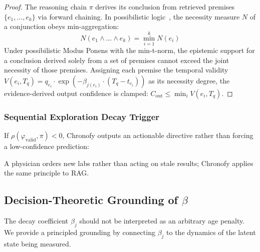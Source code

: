 \documentclass[conference]{IEEEtran}
\begin{document}
\begin{proof}
The reasoning chain $\pi$ derives its conclusion from retrieved premises $\{e_1, \ldots, e_k\}$ via forward chaining. In possibilistic logic~\cite{dubois2025possibilistic}, the necessity measure $N$ of a conjunction obeys min-aggregation:
\begin{equation}
    N(e_1 \land \dots \land e_k) = \min_{i=1}^{k} N(e_i)
\end{equation}
Under possibilistic Modus Ponens with the min-t-norm, the epistemic support for a conclusion derived solely from a set of premises cannot exceed the joint necessity of those premises. Assigning each premise the temporal validity $V(e_i, T_q) = q_{e_i} \cdot \exp(-\beta_{j(e_i)} \cdot (T_q - t_{e_i}))$ as its necessity degree, the evidence-derived output confidence is clamped: $C_{\text{out}} \leq \min_i V(e_i, T_q)$.
\end{proof}

\subsubsection{Sequential Exploration Decay Trigger}

If $\rho(\varphi_{\text{valid}}, \pi) < 0$, Chronofy outputs an actionable directive rather than forcing a low-confidence prediction:

\vspace{0.3em}
\noindent{}
\vspace{0.3em}

\noindent A physician orders new labs rather than acting on stale results; Chronofy applies the same principle to RAG.

\subsection{Decision-Theoretic Grounding of \texorpdfstring{$\beta$}{beta}}
\label{sec:grounding}

The decay coefficient $\beta_j$ should not be interpreted as an arbitrary age penalty. We provide a principled grounding by connecting $\beta_j$ to the dynamics of the latent state being measured.
\end{document}
